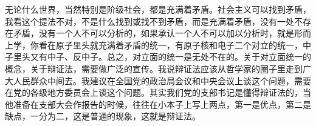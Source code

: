 无论什么世界，当然特别是阶级社会，都是充满着矛盾。社会主义可以找到矛盾，我看这个提法不对，不是什么找到或找不到矛盾，而是充满着矛盾，没有一处不存在矛盾，没有一个人不可以分析的，如果承认一个人不可以加以分析时，就是形而上学，你看在原子里头就充满着矛盾的统一，有原子核和电子二个对立的统一，中子里头又有中子、反中子。总之，对立面的统一是无处不在的。关于对立面统一的概念，关于辩证法，需要做广泛的宣传。我说辩证法应该从哲学家的圈子里走到广大人民群众中间去。我建议在全国党的政治局会议和中央会议上谈这个问题，需要在党的各级地方委员会上谈这个问题。其实我们党的支部书记是懂得辩证法的，当他准备在支部大会作报告的时候，往往在小本子上写上两点，第一是优点，第二是缺点，一分为二，这是普通的现象，这就是辩证法。

